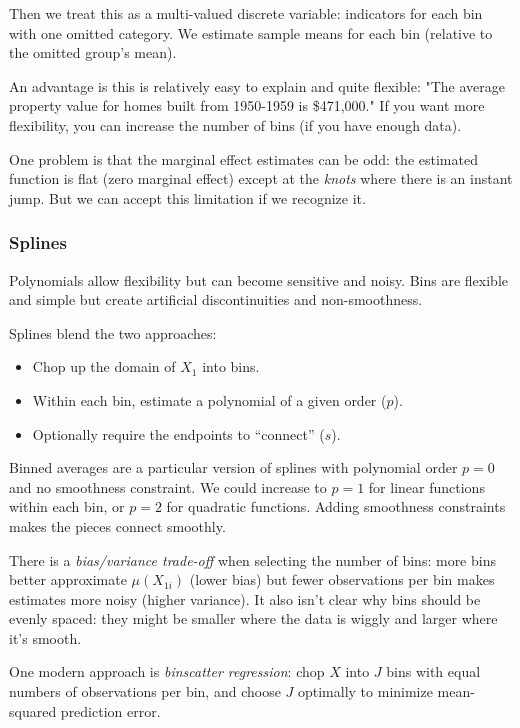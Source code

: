 \documentclass[12pt]{article}
\begin{document}
\begin{multicols}{2}
  Then we treat this as a multi-valued discrete variable: indicators for each bin with one omitted category. We estimate sample means for each bin (relative to the omitted group's mean).

  An advantage is this is relatively easy to explain and quite flexible: "The average property value for homes built from 1950-1959 is \$471,000." If you want more flexibility, you can increase the number of bins (if you have enough data).

  One problem is that the marginal effect estimates can be odd: the estimated function is flat (zero marginal effect) except at the \emph{knots} where there is an instant jump. But we can accept this limitation if we recognize it.

  \subsubsection*{Splines}

  Polynomials allow flexibility but can become sensitive and noisy. Bins are flexible and simple but create artificial discontinuities and non-smoothness.

  Splines blend the two approaches:
  \begin{itemize}
    \item Chop up the domain of $X_1$ into bins.
    \item Within each bin, estimate a polynomial of a given order ($p$).
    \item Optionally require the endpoints to ``connect'' ($s$).
  \end{itemize}

  Binned averages are a particular version of splines with polynomial order $p = 0$ and no smoothness constraint. We could increase to $p = 1$ for linear functions within each bin, or $p = 2$ for quadratic functions. Adding smoothness constraints makes the pieces connect smoothly.

  There is a \emph{bias/variance trade-off} when selecting the number of bins: more bins better approximate $\mu(X_{1i})$ (lower bias) but fewer observations per bin makes estimates more noisy (higher variance). 
  It also isn't clear why bins should be evenly spaced: they might be smaller where the data is wiggly and larger where it's smooth.

  One modern approach is \emph{binscatter regression}: chop $X$ into $J$ bins with equal numbers of observations per bin, and choose $J$ optimally to minimize mean-squared prediction error.


\end{multicols}
\end{document}
